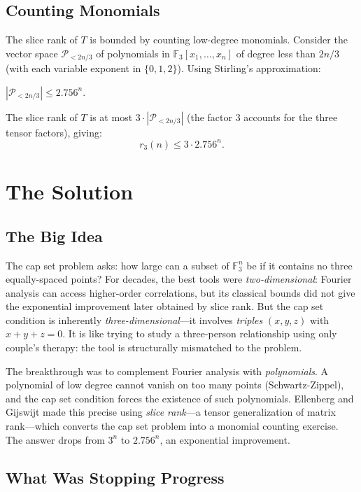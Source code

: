 \subsection{Counting Monomials}

The slice rank of $T$ is bounded by counting low-degree monomials. Consider the vector space $\mathcal{P}_{<2n/3}$ of polynomials in $\mathbb{F}_3[x_1, \ldots, x_n]$ of degree less than $2n/3$ (with each variable exponent in $\{0, 1, 2\}$). Using Stirling's approximation:

\begin{theorem}
$|\mathcal{P}_{<2n/3}| \le 2.756^n$.
\end{theorem}

The slice rank of $T$ is at most $3 \cdot |\mathcal{P}_{<2n/3}|$ (the factor 3 accounts for the three tensor factors), giving:
\[
r_3(n) \le 3 \cdot 2.756^n.
\]

\section{The Solution}

\subsection{The Big Idea}

The cap set problem asks: how large can a subset of $\mathbb{F}_3^n$ be if it contains no three equally-spaced points? For decades, the best tools were \emph{two-dimensional}: Fourier analysis can access higher-order correlations, but its classical bounds did not give the exponential improvement later obtained by slice rank. But the cap set condition is inherently \emph{three-dimensional}---it involves \emph{triples} $(x, y, z)$ with $x + y + z = 0$. It is like trying to study a three-person relationship using only couple's therapy: the tool is structurally mismatched to the problem.

The breakthrough was to complement Fourier analysis with \emph{polynomials}. A polynomial of low degree cannot vanish on too many points (Schwartz-Zippel), and the cap set condition forces the existence of such polynomials. Ellenberg and Gijswijt made this precise using \emph{slice rank}---a tensor generalization of matrix rank---which converts the cap set problem into a monomial counting exercise. The answer drops from $3^n$ to $2.756^n$, an exponential improvement.

\subsection{What Was Stopping Progress}

